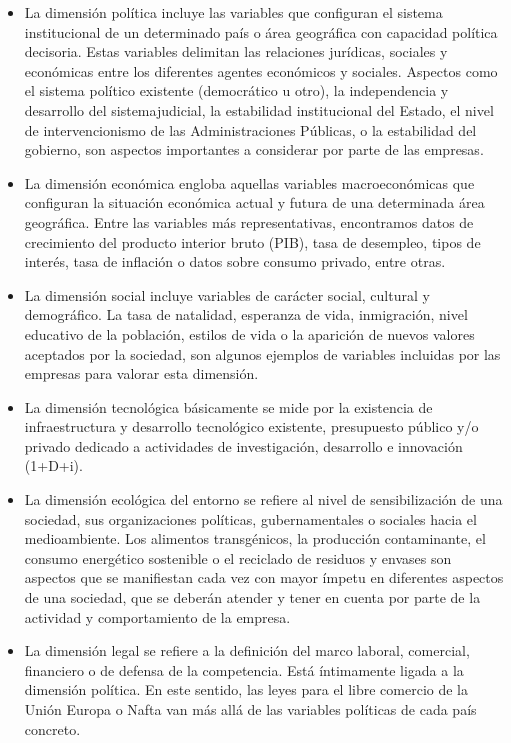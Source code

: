 \documentclass[
]{krantz}
\providecommand{\tightlist}{%
  \setlength{\itemsep}{0pt}\setlength{\parskip}{0pt}}
\begin{document}
\begin{itemize}
\tightlist
\item
  La dimensión política incluye las variables que configuran el sistema institucional de un determinado país o área geográfica con capacidad política decisoria. Estas variables delimitan las relaciones jurídicas, sociales y económicas entre los diferentes agentes económicos y sociales. Aspectos como el sistema político existente (democrático u otro), la independencia y desarrollo del sistemajudicial, la estabilidad institucional del Estado, el nivel de intervencionismo de las Administraciones Públicas, o la estabilidad del gobierno, son aspectos importantes a considerar por parte de las empresas.
\item
  La dimensión económica engloba aquellas variables macroeconómicas que configuran la situación económica actual y futura de una determinada área geográfica. Entre las variables más representativas, encontramos datos de crecimiento del producto interior bruto (PIB), tasa de desempleo, tipos de interés, tasa de inflación o datos sobre consumo privado, entre otras.
\item
  La dimensión social incluye variables de carácter social, cultural y demográfico. La tasa de natalidad, esperanza de vida, inmigración, nivel educativo de la población, estilos de vida o la aparición de nuevos valores aceptados por la sociedad, son algunos ejemplos de variables incluidas por las empresas para valorar esta dimensión.
\item
  La dimensión tecnológica básicamente se mide por la existencia de infraestructura y desarrollo tecnológico existente, presupuesto público y/o privado dedicado a actividades de investigación, desarrollo e innovación (1+D+i).
\item
  La dimensión ecológica del entorno se refiere al nivel de sensibilización de una sociedad, sus organizaciones políticas, gubernamentales o sociales hacia el medioambiente. Los alimentos transgénicos, la producción contaminante, el consumo energético sostenible o el reciclado de residuos y envases son aspectos que se manifiestan cada vez con mayor ímpetu en diferentes aspectos de una sociedad, que se deberán atender y tener en cuenta por parte de la actividad y comportamiento de la empresa.
\item
  La dimensión legal se refiere a la definición del marco laboral, comercial, financiero o de defensa de la competencia. Está íntimamente ligada a la dimensión política. En este sentido, las leyes para el libre comercio de la Unión Europa o Nafta van más allá de las variables políticas de cada país concreto.
\end{itemize}
\end{document}
